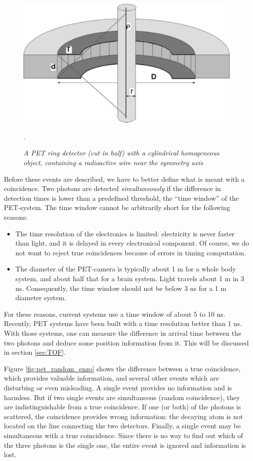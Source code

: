 %
\begin{figure}[tb]
\centering
\includegraphics[width=\figone]{figs/fig_pet_septa.pdf}
\caption{\label{fig:pet_septa} \emph{A PET ring detector (cut in half) with a
cylindrical homogeneous object, containing a radioactive wire near the
symmetry axis}}.
\end{figure}

Before these events are described, we have to better define what is meant with
a coincidence. Two photons are detected {\em simultaneously} if the difference
in detection times is lower than a predefined threshold, the ``time window''
of the PET-system. The time window cannot be arbitrarily short for the
following reasons:
\begin{itemize}
  \item The time resolution of the electronics is limited: electricity is
        never faster than light, and it is delayed in every electronical
        component.  Of course, we do not want to reject true coincidences
        because of errors in timing computation.
  \item The diameter of the PET-camera is typically about 1 m for a
        whole body system, and about half that for a brain
        system. Light travels about 1 m in 3 ns. Consequently, the
        time window should not be below 3 ns for a 1 m diameter
        system.
\end{itemize}
For these reasons, current systems use a time window of about 5 to 10
ns. Recently, PET systems have been built with a time resolution
better than 1 ns. With those systems, one can measure the difference
in arrival time between the two photons and deduce some position
information from it. This will be discussed in section \ref{sec:TOF}.

Figure \ref{fig:pet_random_enzo} shows the difference between a true
coincidence, which provides valuable information, and several other events
which are disturbing or even misleading. A single event provides no
information and is harmless. But if two single events are simultaneous (random
coincidence), they are indistinguishable from a true coincidence. If one (or
both) of the photons is scattered, the coincidence provides wrong information:
the decaying atom is not located on the line connecting the two
detectors. Finally, a single event may be simultaneous with a true
coincidence. Since there is no way to find out which of the three photons is
the single one, the entire event is ignored and information is lost.

